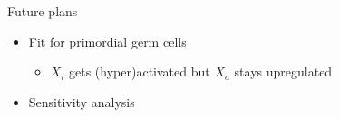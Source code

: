 \documentclass[aspectratio=169,9pt]{beamer}
\begin{document}
    \begin{frame}{Future plans}
        \begin{itemize}
            \item Fit for primordial germ cells
                \begin{itemize}
                    \item $X_i$ gets (hyper)activated but $X_a$ stays upregulated
                \end{itemize}
            \item Sensitivity analysis
        \end{itemize}
    \end{frame}

    \begin{frame}[allowframebreaks]
        \printbibliography
    \end{frame}
\end{document}
